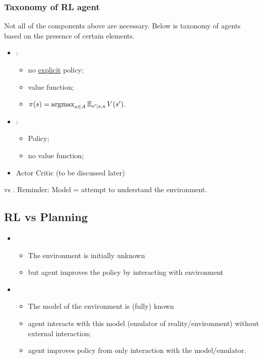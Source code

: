 \subsubsection{Taxonomy of RL agent}
Not all of the components above are necessary. Below is taxonomy of agents based on the presence    of certain elements.
\begin{itemize}
	\item {}: 
	\begin{itemize}
		\item no \underline{explicit} policy;
		\item value function;
		\item $\pi(s) = \operatorname*{argmax}_{a \in A} \operatorname{\mathbb{E}}_{s'|s,a} V(s')$.
	\end{itemize}
	\item {}:
	\begin{itemize}
		\item Policy;
		\item no value function;
	\end{itemize}
	\item Actor Critic (to be discussed later)
\end{itemize}


 vs . Reminder: Model = attempt to understand the environment.

\subsection{RL vs Planning}
\begin{itemize}
	\item {}
	\begin{itemize}
		\item The environment is initially unknown
		\item but agent improves the policy by interacting with environment
	\end{itemize}
	\item {}
	\begin{itemize}
		\item The model of the environment is (fully) known
		\item agent interacts with this model (emulator of reality/environment) without external interaction;
		\item agent improves policy from only interaction with the model/emulator.
	\end{itemize}
\end{itemize}

